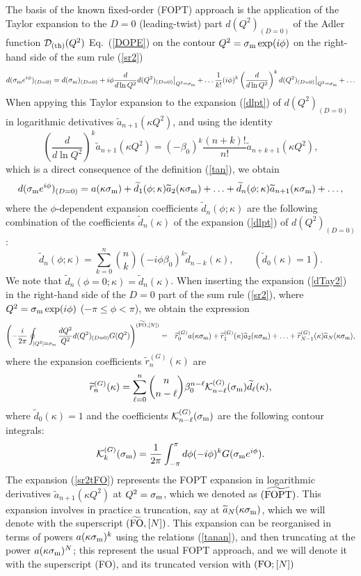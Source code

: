 \documentclass[aps,nofootinbib,showkeys,noshowpacs,preprintnumbers,amsmath,amssymb]{revtex4}
\def\be{\begin{equation}}
\def\ee{\end{equation}}
\def\bea{\begin{eqnarray}}
\def\eea{\end{eqnarray}}
\newcommand{\sm}{{\sigma_{\rm m}}}
\newcommand{\ta}{{\widetilde a}}
\newcommand{\td}{{\widetilde d}}
\newcommand{\tr}{{\widetilde r}}
\begin{document}
The basis of the known fixed-order (FOPT) approach is the application of the Taylor expansion to the $D=0$ (leading-twist) part $d(Q^2)_{(D=0)}$ of the Adler function ${\cal D}_{\rm (th)}(Q^2)$ Eq.~(\ref{DOPE}) on the contour $Q^2=\sm \exp(i \phi)$ on the right-hand side of the sum rule (\ref{sr2})
\be
d(\sm e^{i \phi})_{(D=0)} =  d(\sm)_{(D=0)} + i \phi \frac{d}{d \ln Q^2} d(Q^2)_{(D=0)} {\big |}_{Q^2=\sm} + \ldots \frac{1}{k!} ( i \phi)^k \left( \frac{d}{d \ln Q^2} \right)^k d(Q^2)_{(D=0)} {\big |}_{Q^2=\sm} + \ldots
\label{dTay1} \ee
When appying this Taylor expansion to the expansion (\ref{dlpt}) of  $d(Q^2)_{(D=0)}$ in logarithmic detivatives ${\ta}_{n+1}(\kappa Q^2)$, and using the identity
\be
\left(  \frac{d}{d \ln Q^2} \right)^k  \ta_{n+1}(\kappa Q^2) = (-\beta_0)^k \frac{(n+k)!}{n!} {\ta}_{n+k+1}(\kappa Q^2),
\label{dkta} \ee
which is a direct consequence of the definition (\ref{tan}), we obtain
\be
d(\sm e^{i \phi})_{(D=0)} =  a(\kappa \sm) + {\td}_1(\phi;\kappa) \ta_2(\kappa \sm) + \ldots
+  {\td}_n(\phi;\kappa) \ta_{n+1}(\kappa \sm) + \ldots,
\label{dTay2}
\ee
where the $\phi$-dependent expansion coefficients ${\td}_n(\phi;\kappa)$ are the following combination of the coefficients ${\td}_n(\kappa)$ of the expansion (\ref{dlpt}) of $d(Q^2)_{(D=0)}$:
\be
{\td}_n(\phi;\kappa) = \sum_{k=0}^{n}  \binom{n}{k} (- i \phi \beta_0)^k {\td}_{n-k}(\kappa), \qquad ({\td}_0(\kappa)= 1).
\label{tdnphi} \ee
We note that ${\td}_n(\phi=0;\kappa) = {\td}_n(\kappa)$.
When inserting the expansion (\ref{dTay2}) in the right-hand side of the $D=0$ part of the sum rule (\ref{sr2}), where $Q^2=\sm \exp(i \phi)$  ($-\pi \leq \phi < \pi$), we obtain the expression
\bea
\left( -\frac{i}{2 \pi}   \oint_{|Q^2|=\sm}
\frac{d Q^2}{Q^2} d(Q^2)_{(D=0)} G(Q^2) \right)^{(\widetilde{\rm FO},[N])} & = & {\tr}_0^{(G)} a(\kappa \sm) + {\tr}_1^{(G)}(\kappa) {\ta}_2(\kappa \sm) + \ldots + {\tr}_{N-1}^{(G)}(\kappa) {\ta}_{N}(\kappa \sm) ,
\label{sr2tFO} \eea
where the expansion coefficients ${\tr}_n^{(G)}(\kappa)$ are
\be
 {\tr}_n^{(G)}(\kappa) =  
\sum_{\ell=0}^{n}  \binom{n}{n - \ell} \beta_0^{n-\ell} {\cal K}_{n - \ell}^{(G)}(\sm) {\td}_{\ell}(\kappa),
\label{trn} \ee
where ${\td}_0(\kappa)=1$ and the coefficients ${\cal K}_{n - \ell}^{(G)}(\sm)$ are the following contour integrals:
\be
{\cal K}_{k}^{(G)}(\sm) = \frac{1}{2 \pi} \int_{-\pi}^{\pi} d \phi (- i \phi)^k G(\sm e^{i \phi}).
\label{calKk} \ee
The expansion (\ref{sr2tFO}) represents the FOPT expansion in logarithmic derivatives $\ta_{n+1}(\kappa Q^2)$ at $Q^2=\sm$, which we denoted as  $(\widetilde{{\rm FOPT}})$. This expansion involves in practice a truncation, say at ${\ta}_N(\kappa \sm)$, which we will denote with the superscript $(\widetilde{{\rm FO}}, [N])$. This expansion can be reorganised in terms of powers $a(\kappa \sm)^k$ using the relations (\ref{tanan}), and then truncating at the power $a(\kappa \sm)^N$; this represent the usual FOPT approach, and we will denote it with the superscript (FO), and its truncated version with $({\rm FO}; [N])$
\end{document}
